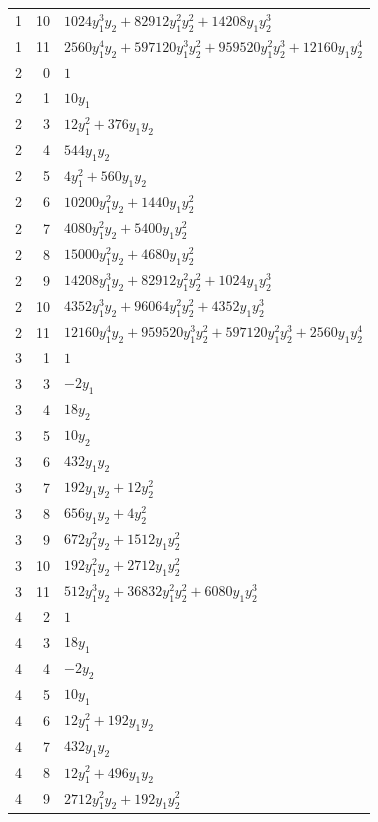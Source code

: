 \documentclass[10pt,a4paper]{article}
\begin{document}
{\begin{longtable}{rrp{125mm}}
1 & 10 & $1024 y_{1}^{3} y_{2} + 82912 y_{1}^{2} y_{2}^{2} + 14208 y_{1} y_{2}^{3}$\\
1 & 11 & $2560 y_{1}^{4} y_{2} + 597120 y_{1}^{3} y_{2}^{2} + 959520 y_{1}^{2} y_{2}^{3} + 12160 y_{1} y_{2}^{4}$\\
2 & 0 & $1$\\
2 & 1 & $10 y_{1}$\\
2 & 3 & $12 y_{1}^{2} + 376 y_{1} y_{2}$\\
2 & 4 & $544 y_{1} y_{2}$\\
2 & 5 & $4 y_{1}^{2} + 560 y_{1} y_{2}$\\
2 & 6 & $10200 y_{1}^{2} y_{2} + 1440 y_{1} y_{2}^{2}$\\
2 & 7 & $4080 y_{1}^{2} y_{2} + 5400 y_{1} y_{2}^{2}$\\
2 & 8 & $15000 y_{1}^{2} y_{2} + 4680 y_{1} y_{2}^{2}$\\
2 & 9 & $14208 y_{1}^{3} y_{2} + 82912 y_{1}^{2} y_{2}^{2} + 1024 y_{1} y_{2}^{3}$\\
2 & 10 & $4352 y_{1}^{3} y_{2} + 96064 y_{1}^{2} y_{2}^{2} + 4352 y_{1} y_{2}^{3}$\\
2 & 11 & $12160 y_{1}^{4} y_{2} + 959520 y_{1}^{3} y_{2}^{2} + 597120 y_{1}^{2} y_{2}^{3} + 2560 y_{1} y_{2}^{4}$\\
3 & 1 & $1$\\
3 & 3 & $- 2 y_{1}$\\
3 & 4 & $18 y_{2}$\\
3 & 5 & $10 y_{2}$\\
3 & 6 & $432 y_{1} y_{2}$\\
3 & 7 & $192 y_{1} y_{2} + 12 y_{2}^{2}$\\
3 & 8 & $656 y_{1} y_{2} + 4 y_{2}^{2}$\\
3 & 9 & $672 y_{1}^{2} y_{2} + 1512 y_{1} y_{2}^{2}$\\
3 & 10 & $192 y_{1}^{2} y_{2} + 2712 y_{1} y_{2}^{2}$\\
3 & 11 & $512 y_{1}^{3} y_{2} + 36832 y_{1}^{2} y_{2}^{2} + 6080 y_{1} y_{2}^{3}$\\
4 & 2 & $1$\\
4 & 3 & $18 y_{1}$\\
4 & 4 & $- 2 y_{2}$\\
4 & 5 & $10 y_{1}$\\
4 & 6 & $12 y_{1}^{2} + 192 y_{1} y_{2}$\\
4 & 7 & $432 y_{1} y_{2}$\\
4 & 8 & $12 y_{1}^{2} + 496 y_{1} y_{2}$\\
4 & 9 & $2712 y_{1}^{2} y_{2} + 192 y_{1} y_{2}^{2}$\\

\end{longtable}}
\end{document}
